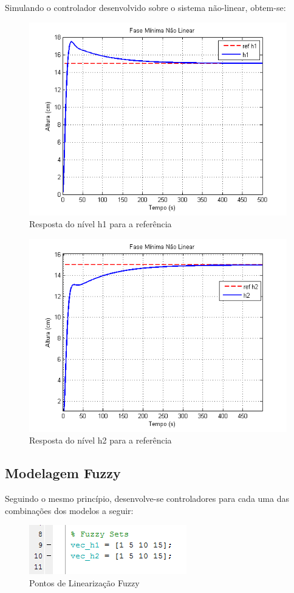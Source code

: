 \documentclass[11pt,]{article}
\begin{document}
	Simulando o controlador desenvolvido sobre o sistema não-linear, obtem-se:
	\begin{figure}[H]
		\centering
		\includegraphics[scale=1]{h1_lin15_nm.png}
		\caption{Resposta do nível h1 para a referência}
		\label{H1_lin15_nm}
	\end{figure}
	\begin{figure}[H]
		\centering
		\includegraphics[scale=1]{h2_lin15_nm.png}
		\caption{Resposta do nível h2 para a referência}
		\label{H2_lin15_nm}
	\end{figure}
	
	\subsection{Modelagem Fuzzy}    
	Seguindo o mesmo princípio, desenvolve-se controladores para cada uma das combinações dos modelos a seguir:
	\begin{figure}[H]
		\centering
		\includegraphics[scale=1]{cod_fuz_1_5_10_15.png}
		\caption{Pontos de Linearização Fuzzy}
		\label{CodigoLinFuzzy_2}
	\end{figure}
	
\end{document}
